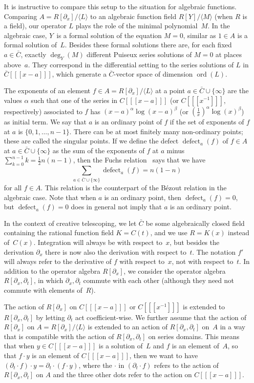 \documentclass[final,1p,times,authoryear]{elsarticle}
\def\ord{\operatorname{ord}}
\def\<#1>{\langle#1\rangle}
\begin{document}
It is instructive to compare this setup to the situation for algebraic
functions. Comparing $A=R[\partial_x]/\<L>$ to an algebraic function field $R[Y]/\<M>$
(when $R$ is a field), our operator $L$ plays the role of the minimal
polynomial~$M$. In the algebraic case, $Y$~is a formal solution of the equation
$M=0$, similar as $1\in A$ is a formal solution of~$L$. Besides these formal
solutions there are, for each fixed $a\in\bar C$, exactly $\deg_Y(M)$ different
Puiseux series solutions of $M=0$ at places above~$a$. They correspond in the
differential setting to the series solutions of $L$ in $\bar C[[[x-a]]]$, which
generate a $\bar C$-vector space of dimension $\ord(L)$.

\def\defect{\operatorname{defect}}%
The exponents of an element $f\in A=R[\partial_x]/\<L>$ at a point $a\in\bar C\cup\{\infty\}$
are the values $\alpha$ such that one of the series in $C[[[x-a]]]$ (or $C[[[x^{-1}]]]$, respectively)
associated to $f$ has $(x-a)^\alpha\log(x-a)^\beta$ (or $(\frac1x)^\alpha\log(x)^\beta$) as initial
term. We say that $a$ is an ordinary point of $f$ if the set of exponents of $f$ at $a$ is $\{0,1,\dots,n-1\}$.
There can be at most finitely many non-ordinary points; these are called the singular points. If we define
the defect $\defect_a(f)$ of $f\in A$ at $a\in\bar C\cup\{\infty\}$ as the sum of the exponents of $f$ at $a$ minus
$\sum_{k=0}^{n-1}k=\frac12n(n-1)$, then the Fuchs relation~\citep{schlesinger95,ince26} says that we have
\[
 \sum_{a\in\bar C\cup\{\infty\}} \defect_a(f) = n(1-n)
\]
for all $f\in A$. This relation is the counterpart of the B\'{e}zout relation in the algebraic case.
Note that when $a$ is an ordinary point, then $\defect_a(f)=0$, but $\defect_a(f)=0$ does in
general not imply that $a$ is an ordinary point.

In the context of creative telescoping, we let $\bar C$ be some algebraically
closed field containing the rational function field $K=C(t)$, and we
use $R=K(x)$ instead of~$C(x)$. Integration will always be with respect to~$x$, but
besides the derivation $\partial_x$ there is now also the derivation with respect
to~$t$. The notation $f'$ will always refer to the derivative of $f$
with respect to~$x$, not with respect to~$t$. In addition to the operator
algebra $R[\partial_x]$, we consider the
operator algebra $R[\partial_x,\partial_t]$, in which $\partial_x,\partial_t$
commute with each other (although they need not commute with elements of~$R$).

The action of $R[\partial_x]$ on $C[[[x-a]]]$ or $C[[[x^{-1}]]]$ is extended
to $R[\partial_x,\partial_t]$ by letting $\partial_t$ act coefficient-wise.
We further assume that the action of $R[\partial_x]$ on $A=R[\partial_x]/\<L>$ is
extended to an action of $R[\partial_x,\partial_t]$ on~$A$ in a way that is
compatible with the action of $R[\partial_x,\partial_t]$ on series domains.
This means that when $y\in C[[[x-a]]]$ is a solution of~$L$ and $f$ is an
element of~$A$, so that $f\cdot y$ is an element of $C[[[x-a]]]$, then we
want to have $(\partial_t\cdot f)\cdot y=\partial_t\cdot(f\cdot y)$, where
the $\cdot$ in $(\partial_t\cdot f)$ refers to the action of $R[\partial_x,\partial_t]$
on $A$ and the three other dots refer to the action on $C[[[x-a]]]$.
\end{document}
